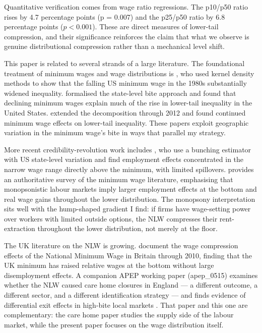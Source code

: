 \documentclass[12pt]{article}
\begin{document}
Quantitative verification comes from wage ratio regressions. The p10/p50 ratio rises by 4.7 percentage points (p = 0.007) and the p25/p50 ratio by 6.8 percentage points ($p < 0.001$). These are direct measures of lower-tail compression, and their significance reinforces the claim that what we observe is genuine distributional compression rather than a mechanical level shift.

This paper is related to several strands of a large literature. The foundational treatment of minimum wages and wage distributions is \citet{dinardo1996labor}, who used kernel density methods to show that the falling US minimum wage in the 1980s substantially widened inequality. \citet{lee1999wage} formalised the state-level bite approach and found that declining minimum wages explain much of the rise in lower-tail inequality in the United States. \citet{autor2016contribution} extended the decomposition through 2012 and found continued minimum wage effects on lower-tail inequality. These papers exploit geographic variation in the minimum wage's bite in ways that parallel my strategy.

More recent credibility-revolution work includes \citet{cengiz2019effect}, who use a bunching estimator with US state-level variation and find employment effects concentrated in the narrow wage range directly above the minimum, with limited spillovers. \citet{dube2019minimum} provides an authoritative survey of the minimum wage literature, emphasising that monopsonistic labour markets imply larger employment effects at the bottom and real wage gains throughout the lower distribution. The monopsony interpretation sits well with the hump-shaped gradient I find: if firms have wage-setting power over workers with limited outside options, the NLW compresses their rent-extraction throughout the lower distribution, not merely at the floor.

The UK literature on the NLW is growing. \citet{butcher2012minimum} document the wage compression effects of the National Minimum Wage in Britain through 2010, finding that the UK minimum has raised relative wages at the bottom without large disemployment effects. A companion APEP working paper (apep\_0515) examines whether the NLW caused care home closures in England --- a different outcome, a different sector, and a different identification strategy --- and finds evidence of differential exit effects in high-bite local markets \citep{apep0515nlw}. That paper and this one are complementary: the care home paper studies the supply side of the labour market, while the present paper focuses on the wage distribution itself.
\end{document}
